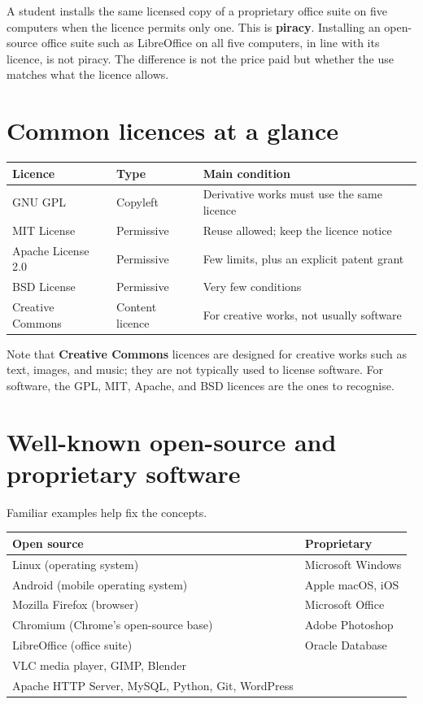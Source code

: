 \begin{example}
A student installs the same licensed copy of a proprietary office suite on
five computers when the licence permits only one. This is \textbf{piracy}.
Installing an open-source office suite such as LibreOffice on all five
computers, in line with its licence, is not piracy. The difference is not the
price paid but whether the use matches what the licence allows.
\end{example}

\section{Common licences at a glance}
\begin{center}
\begin{tabular}{p{}p{}p{}}
\toprule
\textbf{Licence} & \textbf{Type} & \textbf{Main condition} \\
\midrule
GNU GPL & Copyleft & Derivative works must use the same licence \\
MIT License & Permissive & Reuse allowed; keep the licence notice \\
Apache License 2.0 & Permissive & Few limits, plus an explicit patent grant \\
BSD License & Permissive & Very few conditions \\
Creative Commons & Content licence & For creative works, not usually software \\
\bottomrule
\end{tabular}
\end{center}

Note that \textbf{Creative Commons} licences are designed for creative works
such as text, images, and music; they are not typically used to license
software. For software, the GPL, MIT, Apache, and BSD licences are the ones to
recognise.

\section{Well-known open-source and proprietary software}
Familiar examples help fix the concepts.

\begin{center}
\begin{tabular}{p{}p{}}
\toprule
\textbf{Open source} & \textbf{Proprietary} \\
\midrule
Linux (operating system) & Microsoft Windows \\
Android (mobile operating system) & Apple macOS, iOS \\
Mozilla Firefox (browser) & Microsoft Office \\
Chromium (Chrome's open-source base) & Adobe Photoshop \\
LibreOffice (office suite) & Oracle Database \\
VLC media player, GIMP, Blender & \\
Apache HTTP Server, MySQL, Python, Git, WordPress & \\
\bottomrule
\end{tabular}
\end{center}

